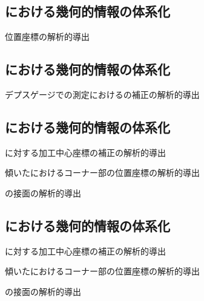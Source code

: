 \subsection{\CenterlineEndFaceDifMeasurement における幾何的情報の体系化}
\begin{enumerate}[label={\sarrow[red]}]
\item \CenterlineEndFaceDifMeasurement 位置座標の解析的導出
\end{enumerate}


\subsection{\KeywayMilling における幾何的情報の体系化}
\begin{enumerate}[label={\sarrow[red]}]
\item[\sarrow] デプスゲージでの測定における\AsideKeywayDepth の補正の解析的導出
\end{enumerate}


\subsection{\EndFaceOutChamferMilling における幾何的情報の体系化}
\begin{enumerate}[label={\sarrow[red]}]
\item \EndFaceOutChamferLength に対する加工中心座標の補正の解析的導出
\item[\sarrow] 傾いた\EndFaceOutChamfer におけるコーナー部の位置座標の解析的導出
\item \EndFaceOutRChamfer の接面の解析的導出
\end{enumerate}


\subsection{\EndFaceInChamferMilling における幾何的情報の体系化}
\begin{enumerate}[label={\sarrow[red]}]
\item \EndFaceInChamferLength に対する加工中心座標の補正の解析的導出
\item[\sarrow] 傾いた\EndFaceInChamfer におけるコーナー部の位置座標の解析的導出
\item \EndFaceInRChamfer の接面の解析的導出
\end{enumerate}


